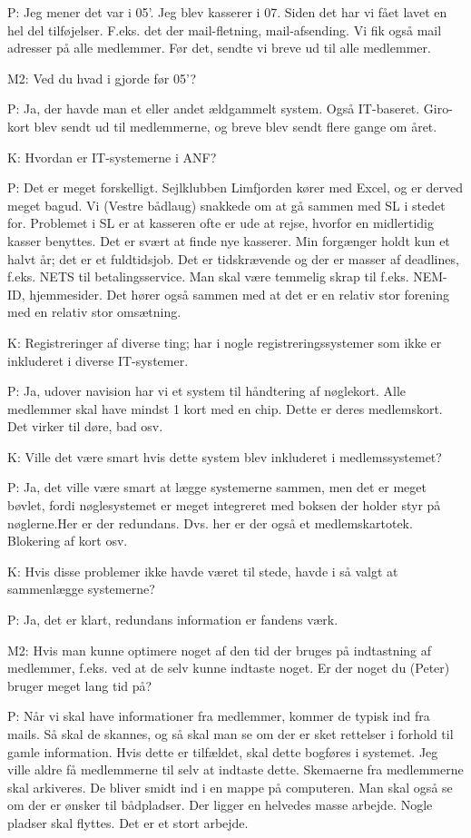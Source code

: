 P: Jeg mener det var i 05'. Jeg blev kasserer i 07. Siden det har vi fået lavet en hel del tilføjelser. F.eks. det der mail-fletning, mail-afsending. Vi fik også mail adresser på alle medlemmer. Før det, sendte vi breve ud til alle medlemmer.

M2: Ved du hvad i gjorde før 05'?

P: Ja, der havde man et eller andet ældgammelt system. Også IT-baseret. Giro-kort blev sendt ud til medlemmerne, og breve blev sendt flere gange om året.

K: Hvordan er IT-systemerne i ANF?

P: Det er meget forskelligt. Sejlklubben Limfjorden kører med Excel, og er derved meget bagud. Vi (Vestre bådlaug) snakkede om at gå sammen med SL i stedet for. Problemet i SL er at kasseren ofte er ude at rejse, hvorfor en midlertidig kasser benyttes. Det er svært at finde nye kasserer. Min forgænger holdt kun et halvt år; det er et fuldtidsjob. Det er tidskrævende og der er masser af deadlines, f.eks. NETS til betalingsservice. Man skal være temmelig skrap til f.eks. NEM-ID, hjemmesider. Det hører også sammen med at det er en relativ stor forening med en relativ stor omsætning.

K: Registreringer af diverse ting; har i nogle registreringssystemer som ikke er inkluderet i diverse IT-systemer.

P: Ja, udover navision har vi et system til håndtering af nøglekort. Alle medlemmer skal have mindst 1 kort med en chip. Dette er deres medlemskort. Det virker til døre, bad osv.

K: Ville det være smart hvis dette system blev inkluderet i medlemssystemet?

P: Ja, det ville være smart at lægge systemerne sammen, men det er meget bøvlet, fordi nøglesystemet er meget integreret med boksen der holder styr på nøglerne.Her er der redundans. Dvs. her er der også et medlemskartotek. Blokering af kort osv. 

K: Hvis disse problemer ikke havde været til stede, havde i så valgt at sammenlægge systemerne?

P: Ja, det er klart, redundans information er fandens værk.

M2: Hvis man kunne optimere noget af den tid der bruges på indtastning af medlemmer, f.eks. ved at de selv kunne indtaste noget. Er der noget du (Peter) bruger meget lang tid på?

P: Når vi skal have informationer fra medlemmer, kommer de typisk ind fra mails. Så skal de skannes, og så skal man se om der er sket rettelser i forhold til gamle information. Hvis dette er tilfældet, skal dette bogføres i systemet. Jeg ville aldre få medlemmerne til selv at indtaste dette. Skemaerne fra medlemmerne skal arkiveres. De bliver smidt ind i en mappe på computeren. Man skal også se om der er ønsker til bådpladser. Der ligger en helvedes masse arbejde. Nogle pladser skal flyttes. Det er et stort arbejde.

